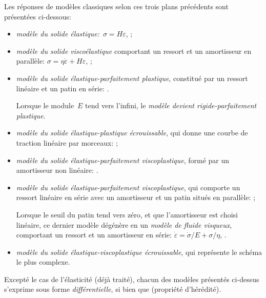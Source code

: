 \medskipvm
Les réponses de modèles classiques selon ces trois plans précédents sont présentées ci-dessous:
\begin{itemize}
  \item \emph{modèle du solide élastique:}~$\sigma = H \varepsilon$, ;
  \item \emph{modèle du solide viscoélastique} comportant un ressort et un amortisseur en parallèle:
	$\sigma=\eta\dot{\varepsilon}+H\varepsilon$, ;
  \item \emph{modèle du solide élastique-parfaitement plastique}, constitué par un ressort linéaire et un patin en série: .

	Lorsque le module~$E$ tend vers l'infini, le \emph{modèle devient rigide-parfaitement plastique}.
  \item \emph{modèle du solide élastique-plastique écrouissable}, qui donne une courbe de traction
	linéaire par morceaux: ;
  \item \emph{modèle du solide élastique-parfaitement viscoplastique}, formé par un amortisseur non linéaire:
	.
\item \emph{modèle du solide élastique-parfaitement viscoplastique}, qui comporte un ressort linéaire en série
	avec un amortisseur et un patin situés en parallèle: ;

	Lorsque le seuil du patin tend vers zéro, et que l'amortisseur est choisi linéaire, ce dernier modèle dégénère en un \emph{modèle de fluide visqueux}, comportant un ressort et un amortisseur en série:
	$\dot{\varepsilon}=\dot{\sigma}/E+\sigma/\eta$, .
  \item \emph{modèle du solide élastique-viscoplastique écrouissable}, qui représente le schéma le plus complexe.
\end{itemize}
\medskipvm
Excepté le cas de l'élasticité (déjà traité), chacun des modèles présentés ci-dessus s'exprime sous forme \emph{différentielle}, si bien que  (propriété d'hérédité).

